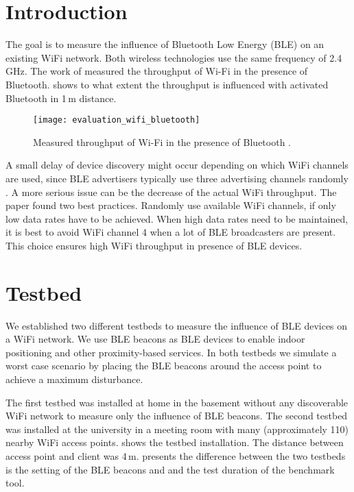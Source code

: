 \section{Introduction}
The goal is to measure the influence of Bluetooth Low Energy 
(BLE) on an existing WiFi network. Both wireless technologies 
use the same frequency of 2.4\,GHz. The work of 
\cite{Lansford.2001} measured the throughput of Wi-Fi in the 
presence of Bluetooth.  
shows to what extent the throughput is influenced with activated 
Bluetooth in 1\,m distance.

\begin{figure}
	\centering
	\texttt{[image: evaluation\_wifi\_bluetooth]}
	\caption{Measured throughput of Wi-Fi in the presence of 
	Bluetooth \cite{Lansford.2001}.}
	\label{fig:EvaluationWiFiBluetooth}
\end{figure}

A small delay of device discovery might occur depending on which 
WiFi channels are used, since BLE advertisers typically use 
three advertising channels randomly \cite{Wyffels.2014}. A more 
serious issue can be the decrease of the actual WiFi throughput. 
The paper \cite{Wyffels.2014} found two best practices. Randomly 
use available WiFi channels, if only low data rates have to be 
achieved. When high data rates need to be maintained, it is best 
to avoid WiFi channel 4 when a lot of BLE broadcasters are 
present. This choice ensures high WiFi throughput in presence of 
BLE devices.

\section{Testbed}
We established two different testbeds to measure the influence 
of BLE devices on a WiFi network. We use BLE beacons as BLE 
devices to enable indoor positioning and other proximity-based 
services. In both testbeds we simulate a worst case scenario by 
placing the BLE beacons around the access point to achieve a 
maximum disturbance.

The first testbed was installed at home in the basement without 
any discoverable WiFi network to measure only the influence of 
BLE beacons. The second testbed was installed at the university 
in a meeting room with many (approximately 110) nearby WiFi 
access points.  shows the 
testbed installation. The distance between access point and 
client was 4\,m.  presents the 
difference between the two testbeds is the setting of the BLE 
beacons and and the test duration of the benchmark tool.

